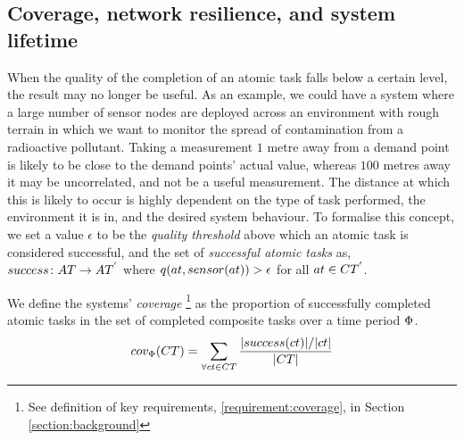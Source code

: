 \subsection{Coverage, network resilience, and system lifetime}
\label{section:coverage}


\newcommand{\varQualityMin}[2]{\epsilon}
\newcommand{\formalTasksSuccess}[2]{
	\functionFormal{success}
	{\setAtomicTask{}{}}
	{\setAtomicTask{}{'}}
}
\newcommand{\functionTasksSuccess}[2]{
\ifx&#1&%
	\functionSignature{success}{\setAtomicTask{}{}}
\else
	\functionSignature{success}{#1}
\fi
}

\newcommand{\formalCompositeTaskCoverage}[2]{
	\functionFormal{taskcov}
	{\setCompositeTask{}{}}
	{\setCompositeTask{}{'}}
}
\newcommand{\functionCompositeTaskCoverage}[2]{
	\functionSignature{taskcov}{\setCompositeTask{}{}}
}


\newcommand{\functionSystemCoverage}[2]{
	\functionSignature{cov_{\setTime{}{}}}{\setCompositeTask{}{}}
}

When the quality of the completion of an atomic task falls below a certain level, the result may no longer be useful. As an example, we could have a system where a large number of sensor nodes are deployed across an environment with rough terrain in which we want to monitor the spread of contamination from a radioactive pollutant. Taking a measurement $1$ metre away from a demand point is likely to be close to the demand points' actual value, whereas $100$ metres away it may be uncorrelated, and not be a useful measurement. The distance at which this is likely to occur is highly dependent on the type of task performed, the environment it is in, and the desired system behaviour. To formalise this concept, we set a value $\varQualityMin{}{}$ to be the \textit{quality threshold} above which an atomic task is considered successful, and the set of \textit{successful atomic tasks} as, $\formalTasksSuccess{}{}$ where $\functionAtomicTaskQualitySensor{}{} > \varQualityMin{}{}$ for all $\varAtomicTask{}{} \in \setCompositeTask{}{'}$. 


We define the systems' \textit{ coverage} \footnote{See definition of key requirements, \ref{requirement:coverage}, in Section \ref{section:background}} as the proportion of successfully completed atomic tasks in the set of completed composite tasks over a time period $\Phi$.
\begin{equation}
	\label{eq:coverage}
	\functionSystemCoverage{}{} = \sum\limits_{\forall \varCompositeTask{}{} \in \setCompositeTask{}{}} 
	\frac
	{\funcSize{\functionTasksSuccess{\varCompositeTask{}{}}{}}/\funcSize{\varCompositeTask{}{}}}
	{\funcSize{\setCompositeTask{}{}}{}}
\end{equation}

